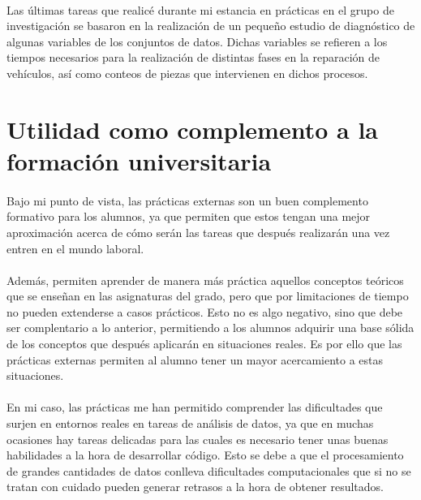 \documentclass[11pt,a4paper,spanish]{article}
\begin{document}
    \paragraph{}
    Las últimas tareas que realicé durante mi estancia en prácticas en el grupo de investigación se basaron en la realización de un pequeño estudio de diagnóstico de algunas variables de los conjuntos de datos. Dichas variables se refieren a los tiempos necesarios para la realización de distintas fases en la reparación de vehículos, así como conteos de piezas que intervienen en dichos procesos.


  \section{Utilidad como complemento a la formación universitaria}

    \paragraph{}
    Bajo mi punto de vista, las prácticas externas son un buen complemento formativo para los alumnos, ya que permiten que estos tengan una mejor aproximación acerca de cómo serán las tareas que después realizarán una vez entren en el mundo laboral.

    \paragraph{}
    Además, permiten aprender de manera más práctica aquellos conceptos teóricos que se enseñan en las asignaturas del grado, pero que por limitaciones de tiempo no pueden extenderse a casos prácticos. Esto no es algo negativo, sino que debe ser complentario a lo anterior, permitiendo a los alumnos adquirir una base sólida de los conceptos que después aplicarán en situaciones reales. Es por ello que las prácticas externas permiten al alumno tener un mayor acercamiento a estas situaciones.

    \paragraph{}
    En mi caso, las prácticas me han permitido comprender las dificultades que surjen en entornos reales en tareas de análisis de datos, ya que en muchas ocasiones hay tareas delicadas para las cuales es necesario tener unas buenas habilidades a la hora de desarrollar código. Esto se debe a que el procesamiento de grandes cantidades de datos conlleva dificultades computacionales que si no se tratan con cuidado pueden generar retrasos a la hora de obtener resultados.
\end{document}
